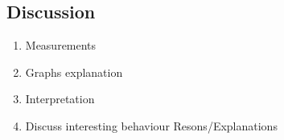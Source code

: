 \subsection{Discussion}

\begin{enumerate}
  \item Measurements
  \item Graphs
  \subitem explanation
  \item Interpretation
  \item Discuss interesting behaviour
  \subitem Resons/Explanations
\end{enumerate}